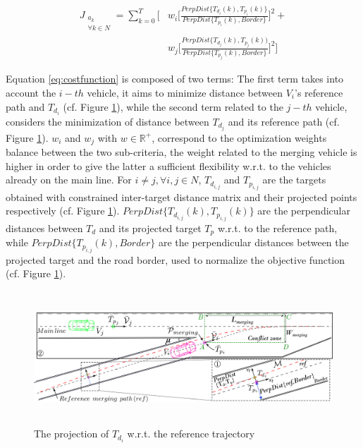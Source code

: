 \begin{align} \label{eq:costfunction}
J_{\substack{ a_{k} \\\forall k  \in {N}}} = \sum_{k=0}^{T} \Bigg[ &w_{i}\Big[\frac{PerpDist\{T_{d_{i}}(k),{T}_{p_{i}}(k)\}}{PerpDist\{{T}_{p_{i}}(k),Border\}}\Big]^2 + \nonumber \\  
&w_{j}\Big[\frac{PerpDist\{T_{d_{j}}(k), {T}_{p_{j}}(k))}{PerpDist\{{T}_{p_{j}}(k),Border\}}\Big]^2\Bigg]
\end{align}

Equation \ref{eq:costfunction} is composed of two terms: The first term takes into account the $i-th$ vehicle, it aims to minimize distance between $V_i$'s reference path and $T_{d_i}$ (cf. Figure \ref{fig:CORM-approximation}), while the second term related to the $j-th$ vehicle, considers the minimization of distance between $T_{d_j}$ and its reference path (cf. Figure \ref{fig:CORM-approximation}). $w_i$ and  $w_j$ with $w \in  \mathbb{R}^{+}$, correspond to the optimization weights balance between the two sub-criteria, the weight related to the merging vehicle is higher in order to give the latter a sufficient flexibility w.r.t. to the vehicles already on the main line. For $i\neq j, \forall i,j \in {N}$, $T_{d_{i,j}}$ and $T_{p_{i,j}}$  are the targets obtained with constrained inter-target distance matrix and their projected points respectively (cf. Figure \ref{fig:CORM-approximation}). $PerpDist\{T_{d_{i,j}}(k),{T}_{p_{i,j}}(k)\}$ are the perpendicular distances between $T_d$ and its projected target $T_p$ w.r.t. to the reference path, while $PerpDist\{{T}_{p_{i,j}}(k),Border\}$ are the perpendicular distances between the projected target and the road border, used to normalize the objective function (cf. Figure \ref{fig:CORM-approximation}). 



       \begin{figure}[!h]
        \centering 
        \includegraphics[width=12cm,height=5cm]{chapters/Chapitre_5/Figures/ScenarioMerging.png}
        \caption{The projection of $T_{d_i}$ w.r.t. the reference trajectory}
        \label{fig:CORM-approximation}
        \end{figure}




